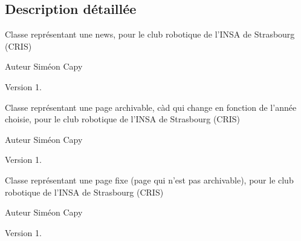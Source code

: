 \subsection{Description détaillée}
Classe représentant une news, pour le club robotique de l'I\+N\+S\+A de Strasbourg (C\+R\+I\+S) \begin{DoxyAuthor}{Auteur}
Siméon Capy 
\end{DoxyAuthor}
\begin{DoxyVersion}{Version}
1.
\end{DoxyVersion}
Classe représentant une page archivable, càd qui change en fonction de l'année choisie, pour le club robotique de l'I\+N\+S\+A de Strasbourg (C\+R\+I\+S) \begin{DoxyAuthor}{Auteur}
Siméon Capy 
\end{DoxyAuthor}
\begin{DoxyVersion}{Version}
1.
\end{DoxyVersion}
Classe représentant une page fixe (page qui n'est pas archivable), pour le club robotique de l'I\+N\+S\+A de Strasbourg (C\+R\+I\+S) \begin{DoxyAuthor}{Auteur}
Siméon Capy 
\end{DoxyAuthor}
\begin{DoxyVersion}{Version}
1. 
\end{DoxyVersion}
